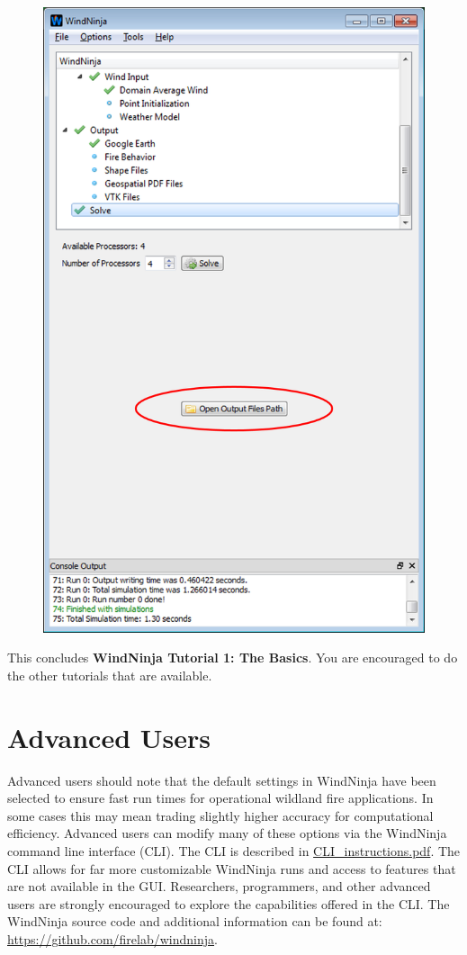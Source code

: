 \documentclass[12pt]{article}
\begin{document}
\begin{figure}[H]
	\label{}
	\centering
	\includegraphics[scale=1.0]{output_path_1}
\end{figure}

This concludes \textbf{WindNinja Tutorial 1: The Basics}.  You are encouraged to do the other tutorials that are available.

\section{Advanced Users}

Advanced users should note that the default settings in WindNinja have been selected to ensure fast run times for operational wildland fire applications. In some cases this may mean trading slightly higher accuracy for computational efficiency.  Advanced users can modify many of these options via the WindNinja command line interface (CLI). The CLI is described in \href{https://weather.firelab.org/windninja/tutorials/CLI_instructions.pdf}{CLI\_instructions.pdf}. The CLI allows for far more customizable WindNinja runs and access to features that are not available in the GUI. Researchers, programmers, and other advanced users are strongly encouraged to explore the capabilities offered in the CLI. The WindNinja source code and additional information can be found at: \url{https://github.com/firelab/windninja}.
\end{document}
